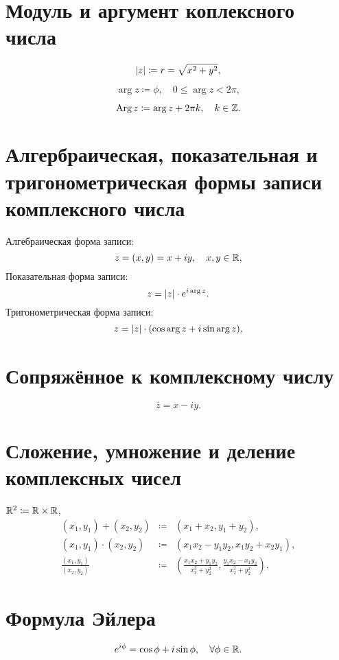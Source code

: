 \section{Модуль и аргумент коплексного числа}

\[
	\left\lvert z\right\rvert \coloneq r = \sqrt{x^2 + y^2},
\]

\[
	\arg z \coloneq \phi, \quad 0 \leqslant \arg z < 2\pi,
\]

\[
	\operatorname{Arg} z \coloneq \arg z + 2\pi k, \quad k \in \mathbb{Z}.
\]

\section{Алгербраическая, показательная и тригонометрическая формы записи комплексного числа}

Алгебраическая форма записи:
\[
	z = (x,y) = x + iy, \quad x,y \in \mathbb{R},
\]
Показательная форма записи:
\[
	z = \left\lvert z\right\rvert \cdot e^{i\arg z}.
\]
Тригонометрическая форма записи:
\[
	z = \left\lvert z\right\rvert \cdot (\cos \arg z + i \sin \arg z),
\]

\section{Сопряжённое к комплексному числу}

\[
	\overline{z} = x - iy.
\]

\section{Сложение, умножение и деление комплексных чисел}

$\mathbb{R}^2 \coloneq \mathbb{R} \times \mathbb{R}$,
\[
	\begin{array}{rcl}
		(x_1, y_1) + (x_2, y_2)       & \coloneq & (x_1 + x_2, y_1 + y_2),                                                             \\
		(x_1, y_1) \cdot (x_2, y_2)   & \coloneq & (x_1 x_2 - y_1 y_2, x_1 y_2 + x_2 y_1),                                             \\
		\frac{(x_1, y_1)}{(x_2, y_2)} & \coloneq & (\frac{x_1 x_2 + y_1 y_2}{x_2^2 + y_2^2}, \frac{y_1 x_2 - x_1 y_2}{x_2^2 + y_2^2}).
	\end{array}
\]

\section{Формула Эйлера}

\[
	e^{i \phi} = \cos \phi + i \sin \phi, \quad \forall \phi \in \mathbb{R}.
\]

